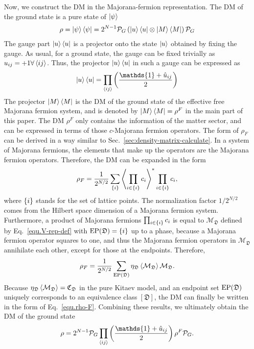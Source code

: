 Now, we construct the DM in the Majorana-fermion representation. The DM of the ground state is a pure state of $\ket{\psi}$
\[
\rho = \ket{\psi}\bra{\psi} = 2^{N-1}\mathcal{P}_G \left( \ket{u}\bra{u}\otimes\ket{M}\bra{M} \right) \mathcal{P}_G
\]
The gauge part $\ket{u}\bra{u}$ is a projector onto the state $\ket{u}$ obtained by fixing the gauge. As usual, for a ground state, the gauge can be fixed trivially as $u_{ij}=+1\forall\left\langle ij \right\rangle$. Thus, the projector $\ket{u}\bra{u}$ in such a gauge can be expressed as
\begin{equation}
    \ket{u}\bra{u} = \prod_{\anglelr{ij}}\lr{\frac{\mathds{1} + \hat{u}_{ij}}{2}}
\end{equation}
The projector $\ket{M}\bra{M}$ is the DM of the ground state of the effective free Majorana fermion system, and is denoted by $\ket{M}\bra{M}=\rho^F$ in the main part of this paper. The DM $\rho^F$ only contains the information of the matter sector, and can be expressed in terms of those $c$-Majorana fermion operators. The form of $\rho_F$ can be derived in a way similar to Sec.~\ref{sec:density-matrix-calculate}. In a system of Majorana fermions, the elements that make up the operators are the Majorana fermion operators. Therefore, the DM can be expanded in the form
\[
\rho_F = \frac{1}{2^{N/2}}\sum_{\left\{ i \right\}} \left\langle \prod_{i\in\left\{ i \right\}}c_i \right\rangle^* \prod_{i\in\left\{ i \right\}}c_i,
\]
where $\left\{ i \right\}$ stands for the set of lattice points. The normalization factor $1/2^{N/2}$ comes from the Hilbert space dimension of a Majorana fermion system. Furthermore, a product of Majorana fermions $\prod_{i\in\left\{ i \right\}}c_i$ is equal to $\mathcal{M}_{\mathfrak{D}}$ defined by Eq.~\eqref{equ.V-rep-def} with $\mathrm{EP}(\mathfrak{D}) = \left\{ i \right\}$ up to a phase, because a Majorana fermion operator squares to one, and thus the Majorana fermion operators in $\mathcal{M}_{\mathfrak{D}}$ annihilate each other, except for those at the endpoints. Therefore, 
\[
\rho_F = \frac{1}{2^{N/2}}\sum_{\mathrm{EP}(\mathfrak{D})}
\eta_{\mathfrak{D}} \left\langle \mathcal{M}_{\mathfrak{D}} \right\rangle\mathcal{M}_{\mathfrak{D}}.
\]
Because $\eta_\mathfrak{D} \left\langle \mathcal{M}_{\mathfrak{D}} \right\rangle = \mathfrak{C}_{\mathfrak{D}}$ in the pure Kitaev model, and an endpoint set $\mathrm{EP}(\mathfrak{D})$ uniquely corresponds to an equivalence class $[\mathfrak{D}]$, the DM can finally be written in the form of Eq.~\eqref{equ.rho-F}. Combining these results, we ultimately obtain the DM of the ground state
\begin{equation}\label{equ.Majorana-density-matrix}
    \rho = 2^{N-1}\mathcal{P}_G\prod_{\anglelr{ij}}\lr{\frac{\mathds{1} + \hat{u}_{ij}}{2}} \rho^F \mathcal{P}_G.
\end{equation}

